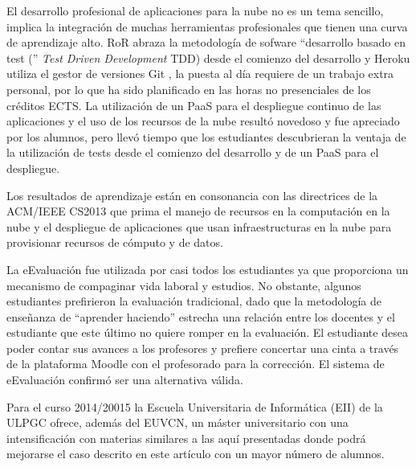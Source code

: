 \documentclass[conference]{IEEEtran}
\begin{document}
El desarrollo profesional de aplicaciones para la nube no es un tema sencillo,
implica la integración de muchas herramientas profesionales que tienen una
curva de aprendizaje alto.
RoR abraza la metodología de sofware ``desarrollo basado en test ('' \textit{Test Driven Development} TDD) \cite{Rappin:2010} desde el comienzo del desarrollo y
Heroku utiliza el gestor de versiones Git \cite{Chacon:2009},
 la puesta al día requiere de un trabajo extra personal, por lo que ha sido planificado en las horas no presenciales de los créditos ECTS.
La utilización de un PaaS para el despliegue continuo de las aplicaciones y el uso de los recursos de la nube resultó novedoso y fue apreciado por los alumnos,
pero llevó tiempo que los estudiantes descubrieran la ventaja de la utilización de tests desde el comienzo del desarrollo y de un PaaS para el despliegue.

Los resultados de aprendizaje están en consonancia con las directrices de la ACM/IEEE CS2013 que prima el manejo de recursos en la computación en la nube
y el despliegue de aplicaciones que usan infraestructuras en la nube para provisionar recursos de cómputo y de datos.

La eEvaluación fue utilizada por casi todos los estudiantes ya que proporciona un mecanismo de compaginar vida laboral y estudios. No obstante, algunos estudiantes prefirieron la evaluación tradicional,
dado que la metodología de enseñanza de ``aprender haciendo'' estrecha una relación entre los docentes y el estudiante que este último no quiere romper en la evaluación.
El estudiante desea poder contar sus avances a los profesores y prefiere concertar una cinta a través de la plataforma Moodle con el profesorado para la corrección.
El sistema de eEvaluación confirmó ser una alternativa válida.

Para el curso 2014/20015 la Escuela Universitaria de Informática (EII) de la ULPGC ofrece, además del EUVCN,  un máster universitario con una intensificación con materias similares a las aquí presentadas donde podrá mejorarse el caso descrito en este artículo con un mayor número de alumnos.

 



                                                            




 





\end{document}
